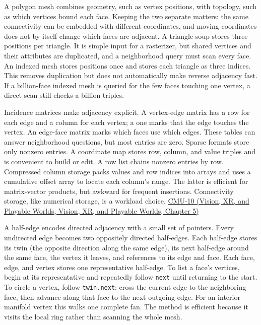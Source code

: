 A polygon mesh combines geometry, such as vertex positions, with topology, such as which vertices bound each face. Keeping the two separate matters: the same connectivity can be embedded with different coordinates, and moving coordinates does not by itself change which faces are adjacent. A triangle soup stores three positions per triangle. It is simple input for a rasterizer, but shared vertices and their attributes are duplicated, and a neighborhood query must scan every face. An indexed mesh stores positions once and stores each triangle as three indices. This removes duplication but does not automatically make reverse adjacency fast. If a billion-face indexed mesh is queried for the few faces touching one vertex, a direct scan still checks a billion triples.

Incidence matrices make adjacency explicit. A vertex-edge matrix has a row for each edge and a column for each vertex; a one marks that the edge touches the vertex. An edge-face matrix marks which faces use which edges. These tables can answer neighborhood questions, but most entries are zero. Sparse formats store only nonzero entries. A coordinate map stores row, column, and value triples and is convenient to build or edit. A row list chains nonzero entries by row. Compressed column storage packs values and row indices into arrays and uses a cumulative offset array to locate each column's range. The latter is efficient for matrix-vector products, but awkward for frequent insertions. Connectivity storage, like numerical storage, is a workload choice. \href{../07-Vision-XR-and-Playable-Worlds/main.pdf\#nameddest=04-visual-computing-ii-ch036-cmu-10---meshes-and-manifolds}{CMU-10 (Vision, XR, and Playable Worlds, Vision, XR, and Playable Worlds, Chapter 5)}

A half-edge encodes directed adjacency with a small set of pointers. Every undirected edge becomes two oppositely directed half-edges. Each half-edge stores its twin (the opposite direction along the same edge), its next half-edge around the same face, the vertex it leaves, and references to its edge and face. Each face, edge, and vertex stores one representative half-edge. To list a face's vertices, begin at its representative and repeatedly follow \texttt{next} until returning to the start. To circle a vertex, follow \texttt{twin.next}: cross the current edge to the neighboring face, then advance along that face to the next outgoing edge. For an interior manifold vertex this walks one complete fan. The method is efficient because it visits the local ring rather than scanning the whole mesh.

